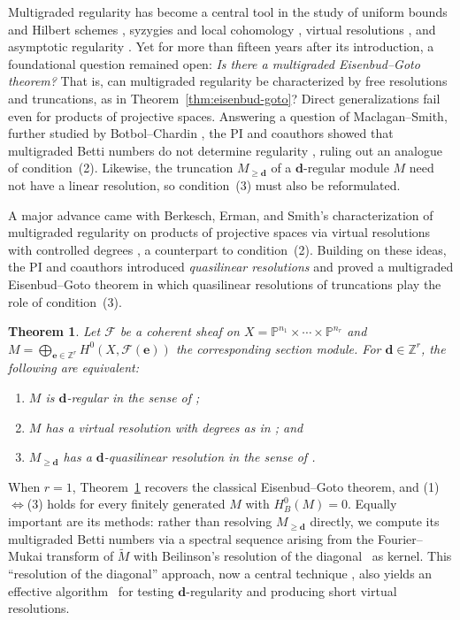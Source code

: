 \documentclass[11pt,reqno]{amsart}
\newtheorem{theorem}[lemma]{Theorem}
\theoremstyle{remark}
\newcommand{\dd}{\mathbf{d}}
\newcommand{\ee}{\mathbf{e}}
\newcommand{\PP}{\mathbb{P}}
\newcommand{\ZZ}{\mathbb{Z}}
\newcommand{\cF}{\mathcal{F}}
\begin{document}
Multigraded regularity has become a central tool in the study of uniform bounds and Hilbert schemes \cite{maclaganSmith05,aramovaCronaDeNegri00}, syzygies and local cohomology \cite{sidmanVanTuylWang06,HSS06,botbolChardin17}, virtual resolutions \cite{BES20,bruceHellerSayrafi26}, and asymptotic regularity \cite{haStrunk07,bruceHellerSayrafiSeceleanu25}. Yet for more than fifteen years after its introduction, a foundational question remained open: \emph{Is there a multigraded Eisenbud--Goto theorem?} That is, can multigraded regularity be characterized by free resolutions and truncations, as in Theorem~\ref{thm:eisenbud-goto}? Direct generalizations fail even for products of projective spaces. Answering a question of Maclagan--Smith, further studied by Botbol--Chardin \cite{botbolChardin17}, the PI and coauthors showed that multigraded Betti numbers do not determine regularity \cite[Ex.~5.1]{bruceHellerSayrafi26}, ruling out an analogue of condition~(2). Likewise, the truncation $M_{\geq \dd}$ of a $\dd$-regular module $M$ need not have a linear resolution, so condition~(3) must also be reformulated.

A major advance came with Berkesch, Erman, and Smith's characterization of multigraded regularity on products of projective spaces via virtual resolutions with controlled degrees \cite[Thm.~2.9]{BES20}, a counterpart to condition~(2). Building on these ideas, the PI and coauthors introduced \emph{quasilinear resolutions} and proved a multigraded Eisenbud--Goto theorem in which quasilinear resolutions of truncations play the role of condition~(3).

\begin{theorem}\cite[Thm.~A]{bruceHellerSayrafi26}\label{thm:mgreg-main}
Let $\cF$ be a coherent sheaf on $X=\PP^{n_1}\times \cdots \times \PP^{n_r}$ and $M=\bigoplus_{\ee\in\ZZ^r} H^0(X,\cF(\ee))$ the corresponding section module. For $\dd \in \ZZ^r$, the following are equivalent:
\begin{enumerate}
\item $M$ is $\dd$-regular in the sense of \cite{maclaganSmith04};
\item $M$ has a virtual resolution with degrees as in \cite[Thm.~2.9]{BES20}; and
\item $M_{\geq \dd}$ has a $\dd$-quasilinear resolution in the sense of \cite{bruceHellerSayrafi26}.
\end{enumerate}
\end{theorem}
When $r=1$, Theorem~\ref{thm:mgreg-main} recovers the classical Eisenbud--Goto theorem, and (1)$\Leftrightarrow$(3) holds for every finitely generated $M$ with $H^0_B(M)=0$. Equally important are its methods: rather than resolving $M_{\geq\dd}$ directly, we compute its multigraded Betti numbers via a spectral sequence arising from the Fourier--Mukai transform of $\widetilde{M}$ with Beilinson's resolution of the diagonal~\cite{beilinson78} as kernel. This ``resolution of the diagonal'' approach, now a central technique \cite{brownErmanTate,brownErman24-1,HHL24,brownSayrafi24}, also yields an effective algorithm~\cite{ABLS20,crantonHellerNemati22} for testing $\dd$-regularity and producing short virtual resolutions.
\end{document}
